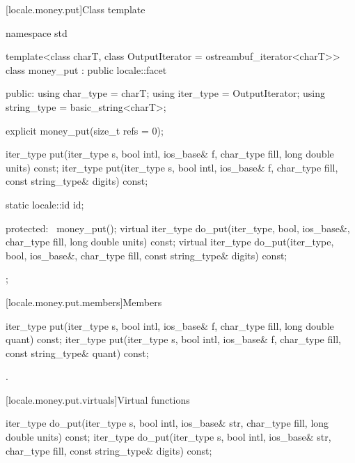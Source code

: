[locale.money.put]{Class template }

%
\begin{codeblock}
namespace std {
  template<class charT, class OutputIterator = ostreambuf_iterator<charT>>
    class money_put : public locale::facet {
    public:
      using char_type   = charT;
      using iter_type   = OutputIterator;
      using string_type = basic_string<charT>;

      explicit money_put(size_t refs = 0);

      iter_type put(iter_type s, bool intl, ios_base& f,
                    char_type fill, long double units) const;
      iter_type put(iter_type s, bool intl, ios_base& f,
                    char_type fill, const string_type& digits) const;

      static locale::id id;

    protected:
      ~money_put();
      virtual iter_type do_put(iter_type, bool, ios_base&, char_type fill,
                               long double units) const;
      virtual iter_type do_put(iter_type, bool, ios_base&, char_type fill,
                               const string_type& digits) const;
    };
}
\end{codeblock}

[locale.money.put.members]{Members}

%
\begin{itemdecl}
iter_type put(iter_type s, bool intl, ios_base& f, char_type fill, long double quant) const;
iter_type put(iter_type s, bool intl, ios_base& f, char_type fill, const string_type& quant) const;
\end{itemdecl}

\begin{itemdescr}
\pnum
\returns
{}.
\end{itemdescr}

[locale.money.put.virtuals]{Virtual functions}

%
\begin{itemdecl}
iter_type do_put(iter_type s, bool intl, ios_base& str,
                 char_type fill, long double units) const;
iter_type do_put(iter_type s, bool intl, ios_base& str,
                 char_type fill, const string_type& digits) const;
\end{itemdecl}

